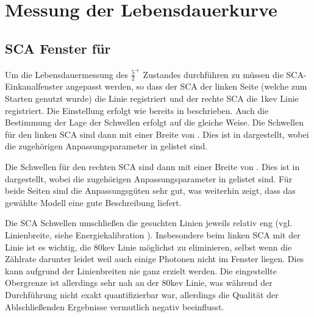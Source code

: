 \chapter{Messung der Lebensdauerkurve}
\section{SCA Fenster für \ba}
Um die Lebensdauermessung des $\frac{5}{2}^+$ \caesium Zustandes durchführen zu müssen die SCA-Einkanalfenster angepasst werden, so dass der SCA der linken Seite (welche zum Starten genutzt wurde) die \startLine  Linie registriert und der rechte SCA die \81kev Linie registriert. Die Einstellung erfolgt wie bereits in  beschrieben. Auch die Bestimmung der Lage der Schwellen erfolgt auf die gleiche Weise. Die Schwellen für den linken SCA sind dann  mit einer Breite von . Dies ist in  dargestellt, wobei die zugehörigen Anpassungsparameter in  gelistet sind.

Die Schwellen für den rechten SCA sind dann  mit einer Breite von . Dies ist in  dargestellt, wobei die zugehörigen Anpassungsparameter in  gelistet sind. Für beide Seiten sind die Anpassungsgüten sehr gut, was weiterhin zeigt, dass das gewählte Modell eine gute Beschreibung liefert.

Die SCA Schwellen umschließen die gesuchten Linien jeweils relativ eng (vgl. Linienbreite, siehe Energiekalibration ). Insbesondere beim linken SCA mit der \startLine Linie ist es wichtig, die \380kev Linie möglichst zu eliminieren, selbst wenn die Zählrate darunter leidet weil auch einige \startLine Photonen nicht im Fenster liegen. Dies kann aufgrund der Linienbreiten nie ganz erzielt werden. Die eingestellte Obergrenze ist allerdings sehr nah an der \380kev Linie, was während der Durchführung nicht exakt quantifizierbar war, allerdings die Qualität der Ablschließenden Ergebnisse vermutlich negativ beeinflusst.



